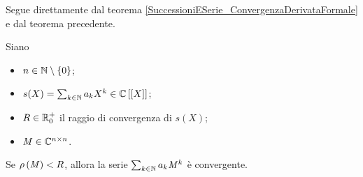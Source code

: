 \Proof Segue direttamente dal teorema \ref{SuccessioniESerie_ConvergenzaDerivataFormale} e dal teorema precedente. \EndProof
\begin{Theorem}
	Siano
  \begin{itemize}
    \item $n \in \mathbb{N} \setminus \lbrace 0 \rbrace$;
    \item $s(X) = \sum_{k \in \mathbb{N}} a_k X^k
                \in \mathbb{C} \left [ \left [ X \right ] \right ]$;
    \item $R \in \mathbb{R}^+_0$ il raggio di convergenza
      di $s(X)$;
    \item $\mathit{M} \in \mathbb{C}^{n \times n}$.
  \end{itemize}
  Se $\rho \left ( \mathit{M} \right ) < R$, allora la serie
  $\sum_{k \in \mathbb{N}} a_k \mathit{M}^k$ \`e convergente.
\end{Theorem}
